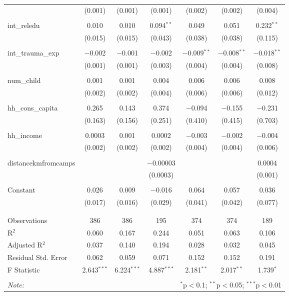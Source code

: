 \begin{table}[H]
\begin{tabular}{@{\extracolsep{4pt}}lcccccc}
  & (0.001) & (0.001) & (0.001) & (0.002) & (0.002) & (0.004) \\ 
  & & & & & & \\ 
 int\_reledu & 0.010 & 0.010 & 0.094$^{**}$ & 0.049 & 0.051 & 0.232$^{**}$ \\ 
  & (0.015) & (0.015) & (0.043) & (0.038) & (0.038) & (0.115) \\ 
  & & & & & & \\ 
 int\_trauma\_exp & $-$0.002 & $-$0.001 & $-$0.002 & $-$0.009$^{**}$ & $-$0.008$^{**}$ & $-$0.018$^{**}$ \\ 
  & (0.001) & (0.001) & (0.003) & (0.004) & (0.004) & (0.008) \\ 
  & & & & & & \\ 
 num\_child & 0.001 & 0.001 & 0.004 & 0.006 & 0.006 & 0.008 \\ 
  & (0.002) & (0.002) & (0.004) & (0.006) & (0.006) & (0.012) \\ 
  & & & & & & \\ 
 hh\_cons\_capita & 0.265 & 0.143 & 0.374 & $-$0.094 & $-$0.155 & $-$0.231 \\ 
  & (0.163) & (0.156) & (0.251) & (0.410) & (0.415) & (0.703) \\ 
  & & & & & & \\ 
 hh\_income & 0.0003 & 0.001 & 0.0002 & $-$0.003 & $-$0.002 & $-$0.004 \\ 
  & (0.002) & (0.002) & (0.002) & (0.004) & (0.004) & (0.006) \\ 
  & & & & & & \\ 
 distancekmfromcamps &  &  & $-$0.00003 &  &  & 0.0004 \\ 
  &  &  & (0.0003) &  &  & (0.001) \\ 
  & & & & & & \\ 
 Constant & 0.026 & 0.009 & $-$0.016 & 0.064 & 0.057 & 0.036 \\ 
  & (0.017) & (0.016) & (0.029) & (0.041) & (0.042) & (0.077) \\ 
  & & & & & & \\ 
\hline \\[-1.8ex] 
Observations & 386 & 386 & 195 & 374 & 374 & 189 \\ 
R$^{2}$ & 0.060 & 0.167 & 0.244 & 0.051 & 0.063 & 0.106 \\ 
Adjusted R$^{2}$ & 0.037 & 0.140 & 0.194 & 0.028 & 0.032 & 0.045 \\ 
Residual Std. Error & 0.062 & 0.059 & 0.071 & 0.152 & 0.152 & 0.191 \\ 
F Statistic & 2.643$^{***}$ & 6.224$^{***}$ & 4.887$^{***}$ & 2.181$^{**}$ & 2.017$^{**}$ & 1.739$^{*}$ \\ 
\hline 
\hline \\[-1.8ex] 
\textit{Note:}  & \multicolumn{6}{r}{$^{*}$p$<$0.1; $^{**}$p$<$0.05; $^{***}$p$<$0.01} \\ 
\end{tabular} 
\end{table} 
